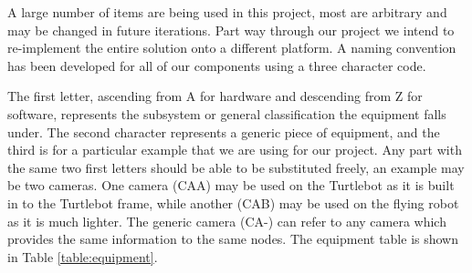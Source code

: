 \documentclass{article}
\begin{document}
	A large number of items are being used in this project, most are arbitrary and may be changed in future iterations. Part way through our project we intend to re-implement the entire solution onto a different platform. A naming convention has been developed for all of our components using a three character code.
	
	The first letter, ascending from A for hardware and descending from Z for software, represents the subsystem or general classification the equipment falls under. The second character represents a generic piece of equipment, and the third is for a particular example that we are using for our project. Any part with the same two first letters should be able to be substituted freely, an example may be two cameras. One camera (CAA) may be used on the Turtlebot as it is built in to the Turtlebot frame, while another (CAB) may be used on the flying robot as it is much lighter. The generic camera (CA-) can refer to any camera which provides the same information to the same nodes. The equipment table is shown in Table \ref{table:equipment}.
	
\end{document}
